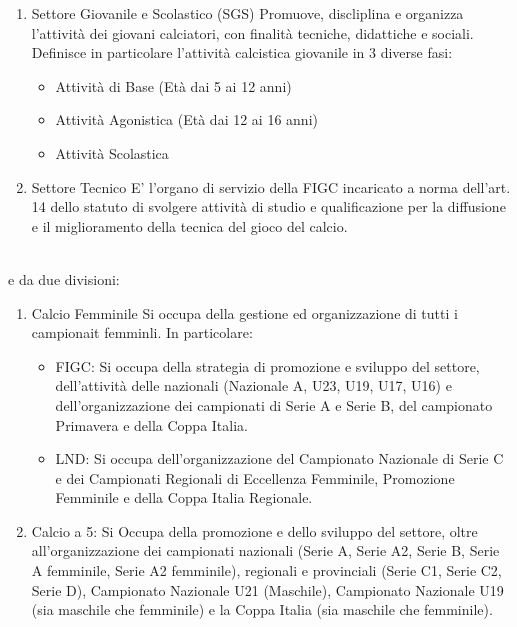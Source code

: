 \documentclass[../uefaC.tex]{subfiles}
\begin{document}
\begin{enumerate}
    \item{Settore Giovanile e Scolastico (SGS)} Promuove, discliplina e organizza l'attività dei giovani calciatori, con finalità tecniche, didattiche e sociali. Definisce in particolare l'attività calcistica giovanile in 3 diverse fasi:
    \begin{itemize}
        \item{Attività di Base} (Età dai 5 ai 12 anni)
        \item{Attività Agonistica} (Età dai 12 ai 16 anni)
        \item{Attività Scolastica}
    \end{itemize}
    \item{Settore Tecnico} E' l'organo di servizio della FIGC incaricato a norma dell'art. 14 dello statuto di svolgere attività di studio e qualificazione per la diffusione e il miglioramento della tecnica del gioco del calcio.
\end{enumerate}
\hfill \\
e da due divisioni:
\begin{enumerate}
    \item{Calcio Femminile} Si occupa della gestione ed organizzazione di tutti i campionait femminli. In particolare:
    \begin{itemize}
        \item{FIGC}: Si occupa della strategia di promozione e sviluppo del settore, dell'attività delle nazionali (Nazionale A, U23, U19, U17, U16) e dell'organizzazione dei campionati di Serie A e Serie B, del campionato Primavera e della Coppa Italia.
        \item{LND}: Si occupa dell'organizzazione del Campionato Nazionale di Serie C e dei Campionati Regionali di Eccellenza Femminile, Promozione Femminile e della Coppa Italia Regionale.
    \end{itemize}
    \item{Calcio a 5}: Si Occupa della promozione e dello sviluppo del settore, oltre all'organizzazione dei campionati nazionali (Serie A, Serie A2, Serie B, Serie A femminile, Serie A2 femminile), regionali e provinciali (Serie C1, Serie C2, Serie D), Campionato Nazionale U21 (Maschile), Campionato Nazionale U19 (sia maschile che femminile) e la Coppa Italia (sia maschile che femminile).
\end{enumerate}
\end{document}
